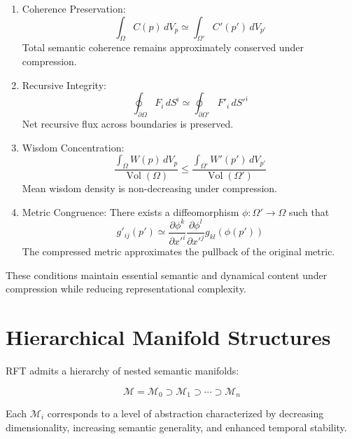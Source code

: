 \begin{enumerate}
    \item Coherence Preservation:
    \begin{equation}
    \int_{\Omega} C(p) \, dV_p \simeq \int_{\Omega'} C'(p') \, dV_{p'}
    \end{equation}
    Total semantic coherence remains approximately conserved under compression.

    \item Recursive Integrity:
    \begin{equation}
    \oint_{\partial \Omega} F_i \, dS^i \simeq \oint_{\partial \Omega'} F'_i \, dS'^i
    \end{equation}
    Net recursive flux across boundaries is preserved.

    \item Wisdom Concentration:
    \begin{equation}
    \frac{\int_{\Omega} W(p) \, dV_p}{\operatorname{Vol}(\Omega)} \leq \frac{\int_{\Omega'} W'(p') \, dV_{p'}}{\operatorname{Vol}(\Omega')}
    \end{equation}
    Mean wisdom density is non-decreasing under compression.

    \item Metric Congruence: There exists a diffeomorphism \(\phi: \Omega' \to \Omega\) such that
    \begin{equation}
    g'_{ij}(p') \simeq \frac{\partial \phi^k}{\partial x'^i} \frac{\partial \phi^l}{\partial x'^j} g_{kl}(\phi(p'))
    \end{equation}
    The compressed metric approximates the pullback of the original metric.
\end{enumerate}

These conditions maintain essential semantic and dynamical content under compression while reducing representational complexity.

\section{Hierarchical Manifold Structures}

RFT admits a hierarchy of nested semantic manifolds:

\begin{equation}
\mathcal{M} = \mathcal{M}_0 \supset \mathcal{M}_1 \supset \cdots \supset \mathcal{M}_n
\end{equation}

Each \(\mathcal{M}_i\) corresponds to a level of abstraction characterized by decreasing dimensionality, increasing semantic generality, and enhanced temporal stability.

